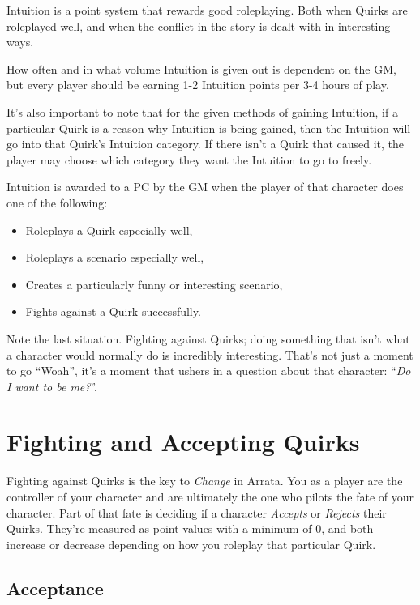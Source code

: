\documentclass[../main.tex]{subfiles}
\begin{document}
    Intuition is a point system that rewards good roleplaying. Both when Quirks are roleplayed well, and when the conflict in the story is dealt with in interesting ways.

    How often and in what volume Intuition is given out is dependent on the GM, but every player should be earning 1-2 Intuition points per 3-4 hours of play.

    It's also important to note that for the given methods of gaining Intuition, if a particular Quirk is a reason why Intuition is being gained, then the Intuition will go into that Quirk's Intuition category. If there isn't a Quirk that caused it, the player may choose which category they want the Intuition to go to freely.

    Intuition is awarded to a PC by the GM when the player of that character does one of the following:

    \begin{itemize}
        \item Roleplays a Quirk especially well,
        \item Roleplays a scenario especially well,
        \item Creates a particularly funny or interesting scenario,
        \item Fights against a Quirk successfully.
    \end{itemize}

    Note the last situation. Fighting against Quirks; doing something that isn't what a character would normally do is incredibly interesting. That's not just a moment to go ``Woah'', it's a moment that ushers in a question about that character: ``\emph{Do I want to be me?}''.

    \section{Fighting and Accepting Quirks}
    
    Fighting against Quirks is the key to \emph{Change} in Arrata. You as a player are the controller of your character and are ultimately the one who pilots the fate of your character. Part of that fate is deciding if a character \emph{Accepts} or \emph{Rejects} their Quirks. They're measured as point values with a minimum of 0, and both increase or decrease depending on how you roleplay that particular Quirk.

    \subsection{Acceptance}
\end{document}
